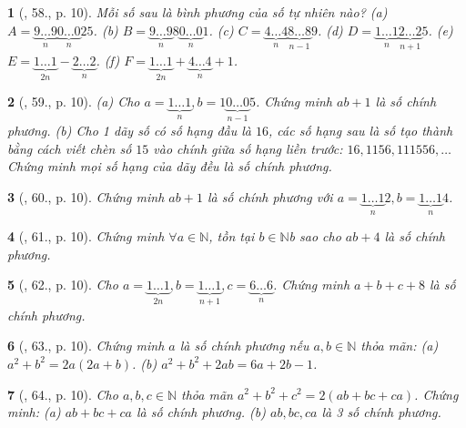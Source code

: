 \documentclass{article}
\newtheorem{baitoan}{}
\begin{document}
\begin{baitoan}[\cite{Binh_Toan_8_tap_1}, 58., p. 10]
	Mỗi số sau là bình phương của số tự nhiên nào? (a) $A = \underbrace{9\ldots9}_n\underbrace{0\ldots0}_n25$. (b) $B = \underbrace{9\ldots9}_n8\underbrace{0\ldots0}_n1$. (c) $C = \underbrace{4\ldots4}_n\underbrace{8\ldots8}_{n-1}9$. (d) $D = \underbrace{1\ldots1}_n\underbrace{2\ldots2}_{n+1}5$. (e) $E = \underbrace{1\ldots1}_{2n} - \underbrace{2\ldots2}_n$. (f) $F = \underbrace{1\ldots1}_{2n} + \underbrace{4\ldots4}_n + 1$.
\end{baitoan}

\begin{baitoan}[\cite{Binh_Toan_8_tap_1}, 59., p. 10]
	(a) Cho $a = \underbrace{1\ldots1}_n,b = 1\underbrace{0\ldots0}_{n-1}5$. Chứng minh $ab + 1$ là số chính phương. (b) Cho 1 dãy số có số hạng đầu là $16$, các số hạng sau là số tạo thành bằng cách viết chèn số $15$ vào chính giữa số hạng liền trước: $16,1156,111556,\ldots$ Chứng minh mọi số hạng của dãy đều là số chính phương.
\end{baitoan}

\begin{baitoan}[\cite{Binh_Toan_8_tap_1}, 60., p. 10]
	Chứng minh $ab + 1$ là số chính phương với $a = \underbrace{1\ldots1}_n2,b = \underbrace{1\ldots1}_n4$.
\end{baitoan}

\begin{baitoan}[\cite{Binh_Toan_8_tap_1}, 61., p. 10]
	Chứng minh $\forall a\in\mathbb{N}$, tồn tại $b\in\mathbb{N}$b sao cho $ab + 4$ là số chính phương.
\end{baitoan}

\begin{baitoan}[\cite{Binh_Toan_8_tap_1}, 62., p. 10]
	Cho $a = \underbrace{1\ldots1}_{2n},b = \underbrace{1\ldots1}_{n+1},c = \underbrace{6\ldots6}_n$. Chứng minh $a + b + c + 8$ là số chính phương.
\end{baitoan}

\begin{baitoan}[\cite{Binh_Toan_8_tap_1}, 63., p. 10]
	Chứng minh $a$ là số chính phương nếu $a,b\in\mathbb{N}$ thỏa mãn: (a) $a^2 + b^2 = 2a(2a + b)$. (b) $a^2 + b^2 + 2ab = 6a + 2b - 1$.
\end{baitoan}

\begin{baitoan}[\cite{Binh_Toan_8_tap_1}, 64., p. 10]
	Cho $a,b,c\in\mathbb{N}$ thỏa mãn $a^2 + b^2 + c^2 = 2(ab + bc + ca)$. Chứng minh: (a) $ab + bc + ca$ là số chính phương. (b) $ab,bc,ca$ là 3 số chính phương.
\end{baitoan}
\end{document}
